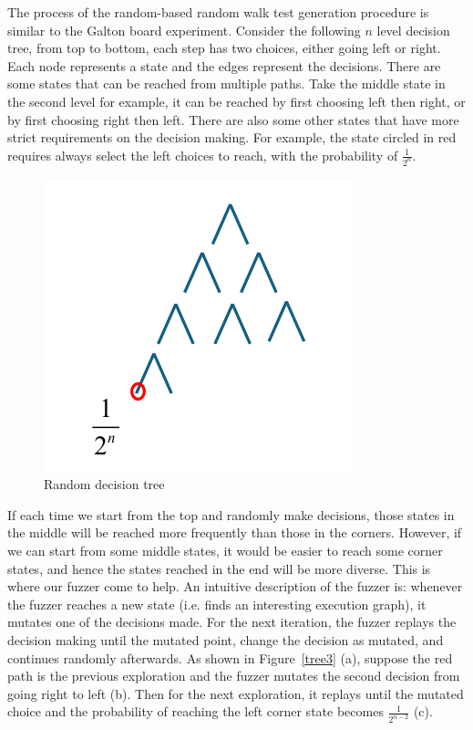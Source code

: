 The process of the random-based random walk test generation procedure is similar to the Galton board experiment. Consider the following $n$ level decision tree, from top to bottom, each step has two choices, either going left or right. Each node represents a state and the edges represent the decisions. There are some states that can be reached from multiple paths. Take the middle state in the second level for example, it can be reached by first choosing left then right, or by first choosing right then left. There are also some other states that have more strict requirements on the decision making. For example, the state circled in red requires always select the left choices to reach, with the probability of $\frac{1}{2^n}$. 
\begin{figure}[htbp] %
    \centering
    \includegraphics[scale=0.5]{figure/tree.pdf} %
    \caption{Random decision tree} %
    \label{tree} %
\end{figure}


If each time we start from the top and randomly make decisions, those states in the middle will be reached more frequently than those in the corners. However, if we can start from some middle states, it would be easier to reach some corner states, and hence the states reached in the end will be more diverse. This is where our fuzzer come to help. An intuitive description of the fuzzer is: whenever the fuzzer reaches a new state (i.e. finds an interesting execution graph), it mutates one of the decisions made. For the next iteration, the fuzzer replays the decision making until the mutated point, change the decision as mutated, and continues randomly afterwards. As shown in Figure~\ref{tree3} (a), suppose the red path is the previous exploration and the fuzzer mutates the second decision from going right to left (b). Then for the next exploration, it replays until the mutated choice and the probability of reaching the left corner state becomes $\frac{1}{2^{n-2}}$ (c). 


